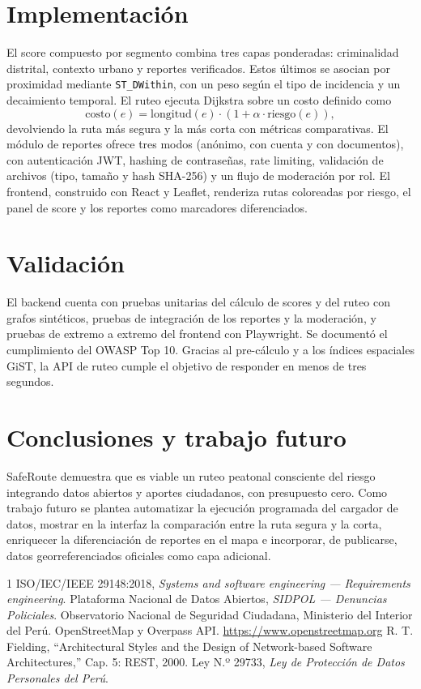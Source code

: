 \documentclass[conference]{IEEEtran}
\begin{document}
\section{Implementación}
El score compuesto por segmento combina tres capas ponderadas: criminalidad distrital, contexto urbano y reportes verificados. Estos últimos se asocian por proximidad mediante \texttt{ST\_DWithin}, con un peso según el tipo de incidencia y un decaimiento temporal. El ruteo ejecuta Dijkstra sobre un costo definido como
\begin{equation}
\text{costo}(e) = \text{longitud}(e) \cdot (1 + \alpha \cdot \text{riesgo}(e)),
\end{equation}
devolviendo la ruta más segura y la más corta con métricas comparativas. El módulo de reportes ofrece tres modos (anónimo, con cuenta y con documentos), con autenticación JWT, hashing de contraseñas, rate limiting, validación de archivos (tipo, tamaño y hash SHA-256) y un flujo de moderación por rol. El frontend, construido con React y Leaflet, renderiza rutas coloreadas por riesgo, el panel de score y los reportes como marcadores diferenciados.

\section{Validación}
El backend cuenta con pruebas unitarias del cálculo de scores y del ruteo con grafos sintéticos, pruebas de integración de los reportes y la moderación, y pruebas de extremo a extremo del frontend con Playwright. Se documentó el cumplimiento del OWASP Top 10. Gracias al pre-cálculo y a los índices espaciales GiST, la API de ruteo cumple el objetivo de responder en menos de tres segundos.

\section{Conclusiones y trabajo futuro}
SafeRoute demuestra que es viable un ruteo peatonal consciente del riesgo integrando datos abiertos y aportes ciudadanos, con presupuesto cero. Como trabajo futuro se plantea automatizar la ejecución programada del cargador de datos, mostrar en la interfaz la comparación entre la ruta segura y la corta, enriquecer la diferenciación de reportes en el mapa e incorporar, de publicarse, datos georreferenciados oficiales como capa adicional.

\begin{thebibliography}{1}
 ISO/IEC/IEEE 29148:2018, \emph{Systems and software engineering --- Requirements engineering}.
 Plataforma Nacional de Datos Abiertos, \emph{SIDPOL --- Denuncias Policiales}.
 Observatorio Nacional de Seguridad Ciudadana, Ministerio del Interior del Perú.
 OpenStreetMap y Overpass API. \url{https://www.openstreetmap.org}
 R. T. Fielding, ``Architectural Styles and the Design of Network-based Software Architectures,'' Cap. 5: REST, 2000.
 Ley N.º 29733, \emph{Ley de Protección de Datos Personales del Perú}.
\end{thebibliography}
\end{document}
